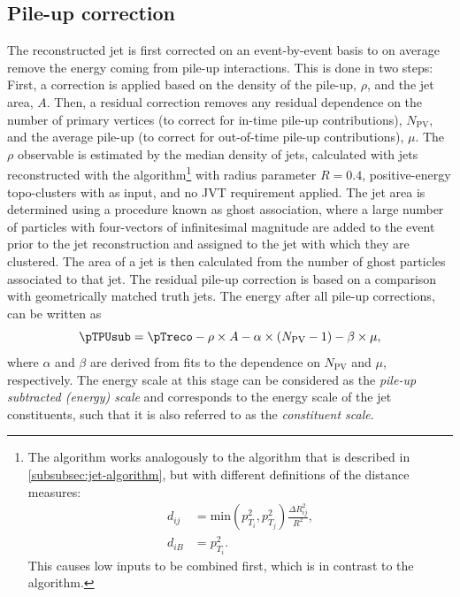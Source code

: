 \subsection{Pile-up correction}
\label{subsec:pile-up-correction}
The reconstructed jet \pT is first corrected on an event-by-event basis to on average remove the energy coming from pile-up interactions. This is done in two steps: First, a correction is applied based on the \pT density of the pile-up, $\rho$, and the jet area, $A$. Then, a residual correction removes any residual \pT dependence on the number of primary vertices (to correct for in-time pile-up contributions), $N_\text{PV}$, and the average pile-up (to correct for out-of-time pile-up contributions), $\mu$.
The $\rho$ observable is estimated by the median \pT density of jets, calculated with jets reconstructed with the \kt algorithm\footnote{The \kt algorithm works analogously to the \antikt algorithm that is described in \cref{subsubsec:jet-algorithm}, but with different definitions of the distance measures:
    \begin{align*}
        d_{ij} & = \text{min}\left(p_{T_i}^2,p_{T_j}^2\right) \frac{\Delta R_{ij}^2}{R^2}, \\
        d_{iB} & = p_{T_i}^2.
        \label{eq:kt-distances}
    \end{align*}
    This causes low \pT inputs to be combined first, which is in contrast to the \antikt algorithm.
}
with radius parameter $R = 0.4$, positive-energy topo-clusters with  as input, and no JVT requirement applied.
The jet area is determined using a procedure known as ghost association, where a large number of particles with four-vectors of infinitesimal magnitude are added to the event prior to the jet reconstruction and assigned to the jet with which they are clustered. The area of a jet is then calculated from the number of ghost particles associated to that jet.
The residual pile-up correction is based on a comparison with geometrically matched truth jets. The energy after all pile-up corrections, can be written as
\begin{equation}
    \label{eq:pTpusub}
    \pTPUsub = \pTreco - \rho \times A - \alpha \times \left( N_{\text{PV}} - 1\right) - \beta \times \mu,
\end{equation}
where $\alpha$ and $\beta$ are derived from fits to the \pT dependence on $N_{\text{PV}}$ and $\mu$, respectively.
The energy scale at this stage can be considered as the \emph{pile-up subtracted (energy) scale} and corresponds to the energy scale of the jet constituents, such that it is also referred to as the \emph{constituent scale}.

